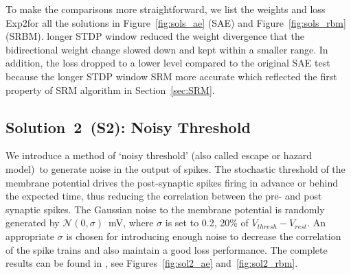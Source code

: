 To make the comparisons more straightforward, we list the weights and loss \DIFdelbegin {}\DIFdelend \DIFaddbegin {}\DIFaddend Exp2\DIFaddbegin {}\DIFaddend for all the solutions in Figure~\ref{fig:sols_ae} (SAE) and Figure~\ref{fig:sols_rbm} (SRBM).
\DIFdelbegin {}\DIFdelend \DIFaddbegin {}\DIFaddend longer STDP window reduced the weight divergence that the bidirectional weight change slowed down and kept within a smaller range.
In addition, the loss dropped to a lower level compared to the original SAE test because the longer STDP window \DIFdelbegin {}\DIFdelend \DIFaddbegin {}\DIFaddend SRM more accurate which reflected \DIFdelbegin {}\DIFdelend the first property of \DIFaddbegin {}\DIFaddend SRM algorithm in Section~\ref{sec:SRM}.



\subsection{Solution~2~(S2): Noisy Threshold}
We introduce a method of `noisy threshold' (also called escape or hazard model)~\DIFdelbegin {}\DIFdelend \DIFaddbegin {}\DIFaddend to generate noise in the output of spikes.
The stochastic threshold of the membrane potential drives the post-synaptic spikes firing in advance or behind the expected time, thus reducing the correlation between the pre- and post synaptic spikes.
The Gaussian noise \DIFdelbegin {}\DIFdelend \DIFaddbegin {}\DIFaddend to the membrane potential is randomly generated by $\mathcal{N}(0, \sigma)$~mV, where $\sigma$ is set to 0.2, 20\% of $V_{thresh} - V_{rest}.$
An appropriate $\sigma$ is chosen for introducing enough noise to decrease the correlation of the spike trains and also maintain a good loss performance.
The complete \DIFdelbegin {}\DIFdelend \DIFaddbegin {}\DIFaddend results can be found in \DIFdelbegin {}\DIFdelend \DIFaddbegin {}\DIFaddend , see Figures~\ref{fig:sol2_ae} and~\ref{fig:sol2_rbm}.

